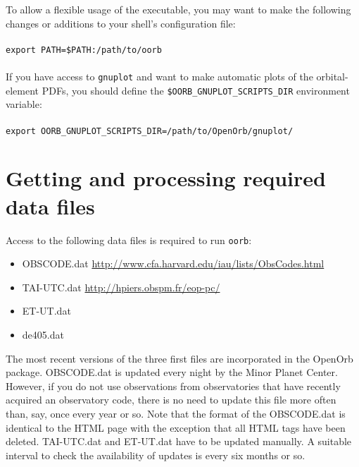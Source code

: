 \documentclass[12pt,english,twoside,a4paper]{report}
\begin{document}
To allow a flexible usage of the executable, you may want to make the
following changes or additions to your shell's configuration file: \\ \\ 
\verb|export PATH=$PATH:/path/to/oorb| \\ \\
If you have access to \verb|gnuplot| and want to make automatic plots
of the orbital-element PDFs, you should define the
\verb|$OORB_GNUPLOT_SCRIPTS_DIR| environment variable: \\ \\ 
\verb|export OORB_GNUPLOT_SCRIPTS_DIR=/path/to/OpenOrb/gnuplot/|


\section{Getting and processing required data files}

Access to the following data files is required to run \verb|oorb|: 
\begin{itemize}
  \item OBSCODE.dat \href{http://www.cfa.harvard.edu/iau/lists/ObsCodes.html}{http://www.cfa.harvard.edu/iau/lists/ObsCodes.html}
  \item TAI-UTC.dat \href{http://hpiers.obspm.fr/eop-pc/}{http://hpiers.obspm.fr/eop-pc/}
  \item ET-UT.dat \href{}{}
  \item de405.dat
\end{itemize}
The most recent versions of the three first files are incorporated in
the OpenOrb package. OBSCODE.dat is updated every night by the Minor
Planet Center. However, if you do not use observations from
observatories that have recently acquired an observatory code, there
is no need to update this file more often than, say, once every year
or so. Note that the format of the OBSCODE.dat is identical to the
HTML page with the exception that all HTML tags have been
deleted. TAI-UTC.dat and ET-UT.dat have to be updated manually. A
suitable interval to check the availability of updates is every six
months or so.
\end{document}
